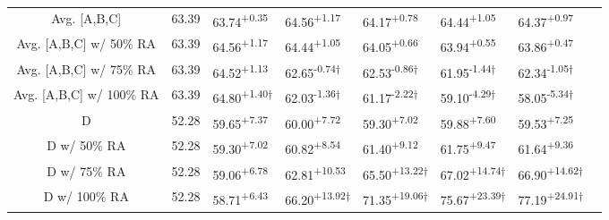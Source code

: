 \documentclass{article} %
\begin{document}
\begin{table}[htbp]
\begin{tabular}{c|lllllll}
    Avg. [A,B,C] & 63.39 & 63.74\textsuperscript{+0.35} & 64.56\textsuperscript{+1.17} & 64.17\textsuperscript{+0.78} & 64.44\textsuperscript{+1.05} & 64.37\textsuperscript{+0.97} \\
    Avg. [A,B,C] w/ 50\% RA &63.39 & 64.56\textsuperscript{+1.17} & 64.44\textsuperscript{+1.05} & 64.05\textsuperscript{+0.66} & 63.94\textsuperscript{+0.55} & 63.86\textsuperscript{+0.47} \\
    Avg. [A,B,C] w/ 75\% RA  &63.39 & 64.52\textsuperscript{+1.13} & 62.65\textsuperscript{-0.74$\dagger$} & 62.53\textsuperscript{-0.86$\dagger$} & 61.95\textsuperscript{-1.44$\dagger$} & 62.34\textsuperscript{-1.05$\dagger$} \\
    Avg. [A,B,C] w/ 100\% RA  &63.39 & 64.80\textsuperscript{+1.40$\dagger$} & 62.03\textsuperscript{-1.36$\dagger$} & 61.17\textsuperscript{-2.22$\dagger$} & 59.10\textsuperscript{-4.29$\dagger$} & 58.05\textsuperscript{-5.34$\dagger$} \\
    \hline
    D & 52.28 & 59.65\textsuperscript{+7.37} & 60.00\textsuperscript{+7.72} &  59.30\textsuperscript{+7.02} & 59.88\textsuperscript{+7.60} & 59.53\textsuperscript{+7.25} \\
    D w/ 50\% RA &52.28 & 59.30\textsuperscript{+7.02} & 60.82\textsuperscript{+8.54} &  61.40\textsuperscript{+9.12}  & 61.75\textsuperscript{+9.47} & 61.64\textsuperscript{+9.36} \\
    D w/ 75\% RA &52.28 & 59.06\textsuperscript{+6.78} & 62.81\textsuperscript{+10.53} & 65.50\textsuperscript{+13.22$\dagger$} & 67.02\textsuperscript{+14.74$\dagger$} & 66.90\textsuperscript{+14.62$\dagger$} \\
    D w/ 100\% RA &52.28 & 58.71\textsuperscript{+6.43} & 66.20\textsuperscript{+13.92$\dagger$} & 71.35\textsuperscript{+19.06$\dagger$} & 75.67\textsuperscript{+23.39$\dagger$} & 77.19\textsuperscript{+24.91$\dagger$} \\
    \hline
  \end{tabular}
  \vspace{-10pt}
\end{table}
\end{document}
